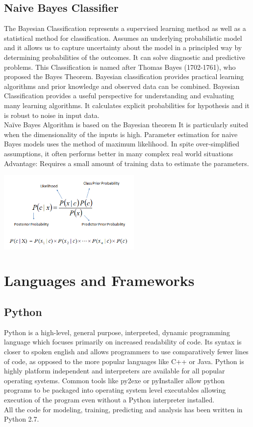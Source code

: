 \documentclass[12pt]{article}
\begin{document}
		\subsection{Naive Bayes Classifier}
		\begin{justify}
			The Bayesian Classification represents a supervised learning method as well as a statistical method for classification. Assumes an underlying probabilistic model and it allows us to capture uncertainty about the model in a principled way by determining probabilities of the outcomes. It can solve diagnostic and predictive problems. This Classification is named after Thomas Bayes (1702-1761), who proposed the Bayes Theorem. Bayesian classification provides practical learning algorithms and prior knowledge and observed data can be combined. Bayesian Classification provides a useful perspective for understanding and evaluating many learning algorithms. It calculates explicit probabilities for hypothesis and it is robust to noise in input data. \\Naïve Bayes Algorithm is based on the Bayesian theorem It is particularly suited when the dimensionality of the inputs is high. Parameter estimation for naive Bayes models uses the method of maximum likelihood. In spite over-simplified assumptions, it often performs better in many complex real world situations Advantage: Requires a small amount of training data to estimate the parameters.
			\begin{center}
				\includegraphics[width=7cm]{nb}
			\end{center}
		\end{justify}
	\section{Languages and Frameworks}
		\subsection{Python}
		\textnormal{Python is a high-level, general purpose, interpreted, dynamic programming language which focuses primarily on increased readability of code. Its syntax is closer to spoken english and allows programmers to use comparatively fewer lines of code, as opposed to the more popular languages like C++ or Java. Python is highly platform independent and interpreters are available for all popular operating systems. Common tools like py2exe or pyInstaller allow python programs to be packaged into operating system level executables allowing execution of the program even without a Python interpreter installed.\\All the code for modeling, training, predicting and analysis has been written in Python 2.7.}
\end{document}
